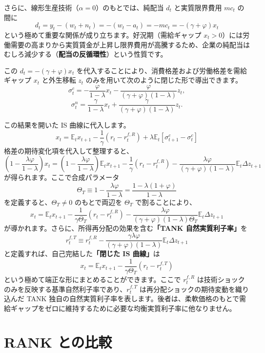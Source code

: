 \documentclass[
  japanese,
  lualatex,
  ja=standard,
  12pt,
  a4paper]{ltjsarticle}
\begin{document}

さらに、線形生産技術（\(\alpha=0\)）のもとでは、純配当 \(d_t\)
と実質限界費用 \(mc_t\) の間に \[
d_t = y_t - (w_t + n_t) = - (w_t - a_t) = - mc_t = -(\gamma+\varphi) x_t
\] という極めて重要な関係が成り立ちます。好況期（需給ギャップ
\(x_t > 0\)）には労働需要の高まりから実質賃金が上昇し限界費用が高騰するため、企業の純配当はむしろ減少する（\textbf{配当の反循環性}）という性質です。

この \(d_t = -(\gamma+\varphi) x_t\)
を代入することにより、消費格差および労働格差を需給ギャップ \(x_t\)
と外生移転 \(z_t\) のみを用いて次のように閉じた形で導出できます。 \[
\sigma_t^c
=
-
\frac{\varphi}{1-\lambda} x_t
-
\frac{\varphi}{(\gamma+\varphi)(1-\lambda)} z_t,
\] \[
\sigma_t^n
=
\frac{\gamma}{1-\lambda} x_t
+
\frac{\gamma}{(\gamma+\varphi)(1-\lambda)} z_t.
\]

この結果を開いた IS 曲線に代入します。 \[
x_t
=
\mathbb{E}_t x_{t+1}
-
\frac{1}{\gamma}(r_t - r_t^{f,R})
+
\lambda \mathbb{E}_t \left[ \sigma_{t+1}^c - \sigma_t^c \right]
\] 格差の期待変化項を代入して整理すると、 \[
\left( 1 - \frac{\lambda \varphi}{1-\lambda} \right) x_t
=
\left( 1 - \frac{\lambda \varphi}{1-\lambda} \right) \mathbb{E}_t x_{t+1}
-
\frac{1}{\gamma}(r_t - r_t^{f,R})
-
\frac{\lambda \varphi}{(\gamma+\varphi)(1-\lambda)} \mathbb{E}_t \Delta z_{t+1}
\] が得られます。ここで合成パラメータ \[
\Theta_T \equiv 1 - \frac{\lambda \varphi}{1-\lambda} = \frac{1 - \lambda(1+\varphi)}{1-\lambda}
\] を定義すると、\(\Theta_T \neq 0\) のもとで両辺を \(\Theta_T\)
で割ることにより、 \[
x_t
=
\mathbb{E}_t x_{t+1}
-
\frac{1}{\gamma \Theta_T}(r_t - r_t^{f,R})
-
\frac{\lambda \varphi}{(\gamma+\varphi)(1-\lambda)\Theta_T} \mathbb{E}_t \Delta z_{t+1}
\] が導かれます。さらに、所得再分配の効果を含む\textbf{「TANK
自然実質利子率」}を \[
r_t^{f,T}
\equiv
r_t^{f,R}
-
\frac{\gamma \lambda \varphi}{(\gamma+\varphi)(1-\lambda)} \mathbb{E}_t \Delta z_{t+1}
\] と定義すれば、自己完結した\textbf{「閉じた IS 曲線」}は \[
x_t
=
\mathbb{E}_t x_{t+1}
-
\frac{1}{\gamma \Theta_T}(r_t - r_t^{f,T})
\] という極めて端正な形にまとめることができます。ここで \(r_t^{f,R}\)
は技術ショックのみを反映する基準自然利子率であり、\(r_t^{f,T}\)
は再分配ショックの期待変動を織り込んだ TANK
独自の自然実質利子率を表します。後者は、柔軟価格のもとで需給ギャップをゼロに維持するために必要な均衡実質利子率に他なりません。

\section{RANK との比較}\label{rank-ux3068ux306eux6bd4ux8f03}
\end{document}
